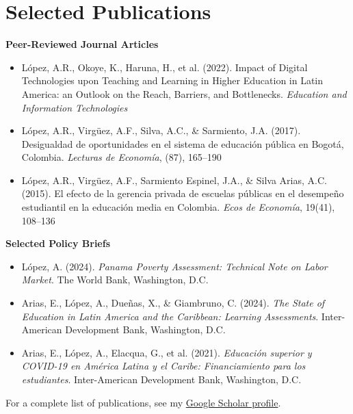 \documentclass[10pt]{article}
\newenvironment{cvitems}{%
  \begin{itemize}[
    leftmargin=1.2em,
    itemsep=0pt,
    parsep=0pt,
    topsep=1pt,
    label={$\bullet$}]%
}{\end{itemize}}
\begin{document}
\section{Selected Publications}

\textbf{Peer-Reviewed Journal Articles}
\begin{cvitems}
  \item L\'opez, A.R., Okoye, K., Haruna, H., et al. (2022). Impact of Digital Technologies upon Teaching and Learning in Higher Education in Latin America: an Outlook on the Reach, Barriers, and Bottlenecks. \textit{Education and Information Technologies}
  \item L\'opez, A.R., Virg\"uez, A.F., Silva, A.C., \& Sarmiento, J.A. (2017). Desigualdad de oportunidades en el sistema de educaci\'on p\'ublica en Bogot\'a, Colombia. \textit{Lecturas de Econom\'ia}, (87), 165--190
  \item L\'opez, A.R., Virg\"uez, A.F., Sarmiento Espinel, J.A., \& Silva Arias, A.C. (2015). El efecto de la gerencia privada de escuelas p\'ublicas en el desempe\~no estudiantil en la educaci\'on media en Colombia. \textit{Ecos de Econom\'ia}, 19(41), 108--136
\end{cvitems}

\vspace{3pt}
\textbf{Selected Policy Briefs}
\begin{cvitems}
  \item L\'opez, A. (2024). \textit{Panama Poverty Assessment: Technical Note on Labor Market}. The World Bank, Washington, D.C.
  \item Arias, E., L\'opez, A., Due\~nas, X., \& Giambruno, C. (2024). \textit{The State of Education in Latin America and the Caribbean: Learning Assessments}. Inter-American Development Bank, Washington, D.C.
  \item Arias, E., L\'opez, A., Elacqua, G., et al. (2021). \textit{Educaci\'on superior y COVID-19 en Am\'erica Latina y el Caribe: Financiamiento para los estudiantes}. Inter-American Development Bank, Washington, D.C.
\end{cvitems}

\vspace{2pt}
For a complete list of publications, see my \href{https://scholar.google.com/citations?user=wfO9incAAAAJ&hl=en}{Google Scholar profile}.

\end{document}
